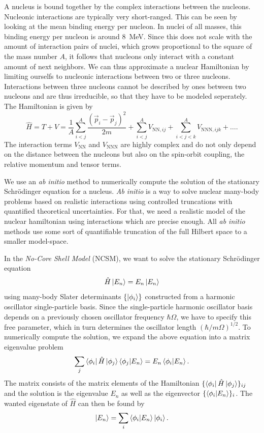 
A nucleus is bound together by the complex interactions between the nucleons. Nucleonic interactions are typically very short-ranged. This can be seen by looking at the mean binding energy per nucleon. In nuclei of all masses, this binding energy per nucleon is around \SI{8}{\mega\electronvolt}. Since this does not scale with the amount of interaction pairs of nuclei, which grows proportional to the square of the mass number $A$, it follows that nucleons only interact with a constant amount of next neighbors. We can thus approximate a nuclear Hamiltonian by limiting ourselfs to nucleonic interactions between two or three nucleons. Interactions between three nucleons cannot be described by ones between two nucleons and are thus irreducible, so that they have to be modeled seperately. The Hamiltonian is given by
\begin{equation}
  \hat{H} = T + V = \frac{1}{A}\sum_{i<j}^A\frac{(\vec{p}_i - \vec{p}_j)^2}{2m} + \sum_{i<j}^A V_{\mathrm{NN}, ij} + \sum_{i<j<k}^AV_{\mathrm{NNN}, ijk} + \dots.
\end{equation}
The interaction terms $V_\mathrm{NN}$ and $V_\mathrm{NNN}$ are highly complex and do not only depend on the distance between the nucleons but also on the spin-orbit coupling, the relative momentum and tensor terms.

We use an \textit{ab initio} method to numerically compute the solution of the stationary Schrödinger equation for a nucleus. \textit{Ab initio} is a way to solve nuclear many-body problems based on realistic interactions using controlled truncations with quantified theoretical uncertainties. For that, we need a realistic model of the nuclear hamiltonian using interactions which are precise enough. All \textit{ab initio} methods use some sort of quantifiable truncation of the full Hilbert space to a smaller model-space.

In the \textit{No-Core Shell Model} (NCSM), we want to solve the stationary Schrödinger equation
\begin{equation}
  \hat{H} \ket{E_n} = E_n \ket{E_n}
\end{equation}
using many-body Slater determinants $\{\ket{\phi_i}\}$ constructed from a harmonic oscillator single-particle basis. Since the single-particle harmonic oscillator basis depends on a previously chosen oscillator frequency $\hbar \Omega$, we have to specify this free parameter, which in turn determines the oscillator length $(\hbar / m\Omega)^{1/2}$. To numerically compute the solution, we expand the above equation into a matrix eigenvalue problem
\begin{equation}
  \sum_j \bra{\phi_i}\hat{H}\ket{\phi_j}\braket{\phi_j | E_n} = E_n \braket{\phi_i | E_n}.
\end{equation}
The matrix consists of the matrix elements of the Hamiltonian $\{\bra{\phi_i}\hat{H}\ket{\phi_j}\}_{ij}$ and the solution is the eigenvalue $E_n$ as well as the eigenvector $\{\braket{\phi_i|E_n}\}_i$. The wanted eigenstate of $\hat{H}$ can then be found by
\begin{equation}
  \ket{E_n} = \sum_i \braket{\phi_i | E_n} \ket{\phi_i}.
\end{equation}

